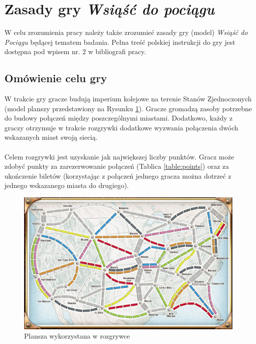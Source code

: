 \documentclass[12pt, oneside]{report}
\begin{document}
\section{Zasady gry \textit{Wsiąść do pociągu}}
W celu zrozumienia pracy należy także zrozumieć zasady gry (model) \textit{Wsiąść do Pociągu} będącej tematem badania. Pełna treść polskiej instrukcji do gry jest dostępna pod wpisem nr. 2 w bibliografi pracy.
\subsection{Omówienie celu gry}
W trakcie gry gracze budują imperium kolejowe na terenie Stanów Zjednoczonych (model planszy przedstawiony na Rysunku \ref{figure:world map}). Gracze gromadzą zasoby potrzebne do budowy połączeń między poszczególnymi miastami. Dodatkowo, każdy z graczy otrzymuje w trakcie rozgrywki dodatkowe wyzwania połączenia dwóch wskazanych miast swoją siecią. \\ \\
Celem rozgrywki jest uzyskanie jak największej liczby punktów. Gracz może zdobyć punkty za zarezerwowanie połączeń (Tablica  \ref{table:points}) oraz za ukończenie biletów (korzystając z połączeń jednego gracza można dotrzeć z jednego wskazanego miasta do drugiego).
 
\begin{figure}[h]
	\includegraphics[width=\linewidth]{ticket-to-ride-board-map.jpg}
	\caption{Plansza wykorzystana w rozgrywce}
	\label{figure:world map}
\end{figure}
\end{document}
